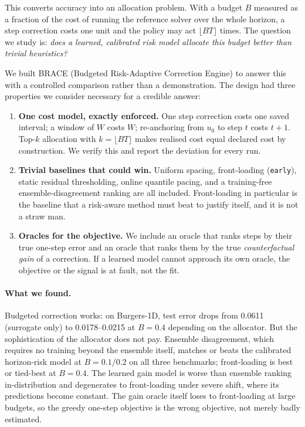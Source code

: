 \documentclass[11pt]{article}
\begin{document}
This converts accuracy into an allocation problem. With a budget $B$ measured
as a fraction of the cost of running the reference solver over the whole
horizon, a step correction costs one unit and the policy may act $\lfloor BT
\rfloor$ times. The question we study is: \emph{does a learned, calibrated risk
model allocate this budget better than trivial heuristics?}

We built BRACE (Budgeted Risk-Adaptive Correction Engine) to answer this with a
controlled comparison rather than a demonstration. The design had three
properties we consider necessary for a credible answer:

\begin{enumerate}
\item \textbf{One cost model, exactly enforced.} One step correction costs one
  saved interval; a window of $W$ costs $W$; re-anchoring from $u_0$ to step $t$
  costs $t+1$. Top-$k$ allocation with $k=\lfloor BT\rfloor$ makes realised cost
  equal declared cost by construction. We verify this and report the deviation
  for every run.
\item \textbf{Trivial baselines that could win.} Uniform spacing, front-loading
  (\texttt{early}), static residual thresholding, online quantile pacing, and a
  training-free ensemble-disagreement ranking are all included. Front-loading in
  particular is the baseline that a risk-aware method must beat to justify
  itself, and it is not a straw man.
\item \textbf{Oracles for the objective.} We include an oracle that ranks steps
  by their true one-step error and an oracle that ranks them by the true
  \emph{counterfactual gain} of a correction. If a learned model cannot
  approach its own oracle, the objective or the signal is at fault, not the
  fit.
\end{enumerate}

\paragraph{What we found.} Budgeted correction works: on Burgers-1D, test error
drops from 0.0611 (surrogate only) to 0.0178--0.0215 at $B=0.4$ depending on the
allocator. But the sophistication of the allocator does not pay. Ensemble
disagreement, which requires no training beyond the ensemble itself, matches or
beats the calibrated horizon-risk model at $B=0.1/0.2$ on all three benchmarks;
front-loading is best or tied-best at $B=0.4$. The learned gain model is worse
than ensemble ranking in-distribution and degenerates to front-loading under
severe shift, where its predictions become constant. The gain oracle itself loses to
front-loading at large budgets, so the greedy one-step objective is the wrong
objective, not merely badly estimated.
\end{document}
